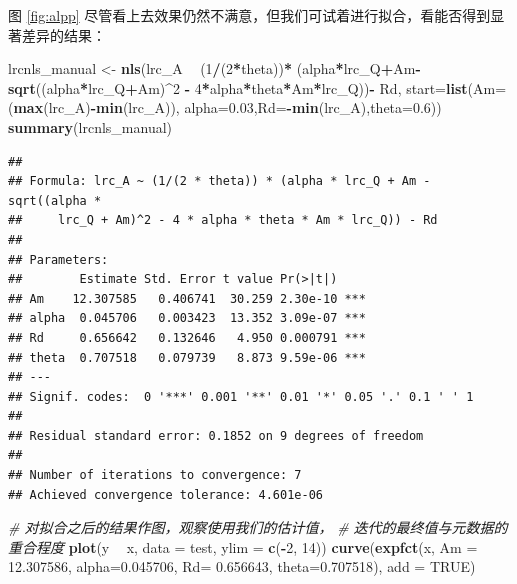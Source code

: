\documentclass[]{krantz}
\makeatletter
\newenvironment{Shaded}{\begin{snugshade}}{\end{snugshade}}
\newcommand{\KeywordTok}[1]{\textcolor[rgb]{0.13,0.29,0.53}{\textbf{#1}}}
\newcommand{\DataTypeTok}[1]{\textcolor[rgb]{0.13,0.29,0.53}{#1}}
\newcommand{\DecValTok}[1]{\textcolor[rgb]{0.00,0.00,0.81}{#1}}
\newcommand{\FloatTok}[1]{\textcolor[rgb]{0.00,0.00,0.81}{#1}}
\newcommand{\StringTok}[1]{\textcolor[rgb]{0.31,0.60,0.02}{#1}}
\newcommand{\CommentTok}[1]{\textcolor[rgb]{0.56,0.35,0.01}{\textit{#1}}}
\newcommand{\OtherTok}[1]{\textcolor[rgb]{0.56,0.35,0.01}{#1}}
\newcommand{\OperatorTok}[1]{\textcolor[rgb]{0.81,0.36,0.00}{\textbf{#1}}}
\newcommand{\NormalTok}[1]{#1}
\newenvironment{kframe}{%
\medskip{}
\setlength{\fboxsep}{.8em}
 \def\at@end@of@kframe{}%
 \ifinner\ifhmode%
  \def\at@end@of@kframe{\end{minipage}}%
  \begin{minipage}{\columnwidth}%
 \fi\fi%
 \def\FrameCommand##1{\hskip\@totalleftmargin \hskip-\fboxsep
 \colorbox{shadecolor}{##1}\hskip-\fboxsep
     \hskip-\linewidth \hskip-\@totalleftmargin \hskip\columnwidth}%
 \MakeFramed {\advance\hsize-\width
   \@totalleftmargin\z@ \linewidth\hsize
   \@setminipage}}%
 {\par\unskip\endMakeFramed%
 \at@end@of@kframe}
\renewenvironment{Shaded}{\begin{kframe}}{\end{kframe}}
\theoremstyle{definition}
\theoremstyle{definition}
\theoremstyle{definition}
\theoremstyle{remark}
\makeatother
\begin{document}
图 \ref{fig:alpp}
尽管看上去效果仍然不满意，但我们可试着进行拟合，看能否得到显著差异的结果：

\begin{Shaded}
\begin{Highlighting}[]
\NormalTok{lrcnls_manual <-}\StringTok{ }\KeywordTok{nls}\NormalTok{(lrc_A }\OperatorTok{~}\StringTok{ }
\StringTok{        }\NormalTok{(}\DecValTok{1}\OperatorTok{/}\NormalTok{(}\DecValTok{2}\OperatorTok{*}\NormalTok{theta))}\OperatorTok{*}
\StringTok{        }\NormalTok{(alpha}\OperatorTok{*}\NormalTok{lrc_Q}\OperatorTok{+}\NormalTok{Am}\OperatorTok{-}\KeywordTok{sqrt}\NormalTok{((alpha}\OperatorTok{*}\NormalTok{lrc_Q}\OperatorTok{+}\NormalTok{Am)}\OperatorTok{^}\DecValTok{2} \OperatorTok{-}\StringTok{ }
\StringTok{                               }\DecValTok{4}\OperatorTok{*}\NormalTok{alpha}\OperatorTok{*}\NormalTok{theta}\OperatorTok{*}\NormalTok{Am}\OperatorTok{*}\NormalTok{lrc_Q))}\OperatorTok{-}\StringTok{ }
\StringTok{        }\NormalTok{Rd, }\DataTypeTok{start=}\KeywordTok{list}\NormalTok{(}\DataTypeTok{Am=}\NormalTok{(}\KeywordTok{max}\NormalTok{(lrc_A)}\OperatorTok{-}\KeywordTok{min}\NormalTok{(lrc_A)),}
                       \DataTypeTok{alpha=}\FloatTok{0.03}\NormalTok{,}\DataTypeTok{Rd=}\OperatorTok{-}\KeywordTok{min}\NormalTok{(lrc_A),}\DataTypeTok{theta=}\FloatTok{0.6}\NormalTok{))}
\KeywordTok{summary}\NormalTok{(lrcnls_manual)}
\end{Highlighting}
\end{Shaded}

\begin{verbatim}
## 
## Formula: lrc_A ~ (1/(2 * theta)) * (alpha * lrc_Q + Am - sqrt((alpha * 
##     lrc_Q + Am)^2 - 4 * alpha * theta * Am * lrc_Q)) - Rd
## 
## Parameters:
##        Estimate Std. Error t value Pr(>|t|)    
## Am    12.307585   0.406741  30.259 2.30e-10 ***
## alpha  0.045706   0.003423  13.352 3.09e-07 ***
## Rd     0.656642   0.132646   4.950 0.000791 ***
## theta  0.707518   0.079739   8.873 9.59e-06 ***
## ---
## Signif. codes:  0 '***' 0.001 '**' 0.01 '*' 0.05 '.' 0.1 ' ' 1
## 
## Residual standard error: 0.1852 on 9 degrees of freedom
## 
## Number of iterations to convergence: 7 
## Achieved convergence tolerance: 4.601e-06
\end{verbatim}

\begin{Shaded}
\begin{Highlighting}[]
\CommentTok{# 对拟合之后的结果作图，观察使用我们的估计值，}
\CommentTok{# 迭代的最终值与元数据的重合程度}
\KeywordTok{plot}\NormalTok{(y }\OperatorTok{~}\StringTok{ }\NormalTok{x, }\DataTypeTok{data =}\NormalTok{ test, }\DataTypeTok{ylim =} \KeywordTok{c}\NormalTok{(}\OperatorTok{-}\DecValTok{2}\NormalTok{, }\DecValTok{14}\NormalTok{))}
\KeywordTok{curve}\NormalTok{(}\KeywordTok{expfct}\NormalTok{(x, }\DataTypeTok{Am =} \FloatTok{12.307586}\NormalTok{,}
     \DataTypeTok{alpha=}\FloatTok{0.045706}\NormalTok{, }\DataTypeTok{Rd=} \FloatTok{0.656643}\NormalTok{, }\DataTypeTok{theta=}\FloatTok{0.707518}\NormalTok{), }\DataTypeTok{add =} \OtherTok{TRUE}\NormalTok{)}
\end{Highlighting}
\end{Shaded}
\end{document}
